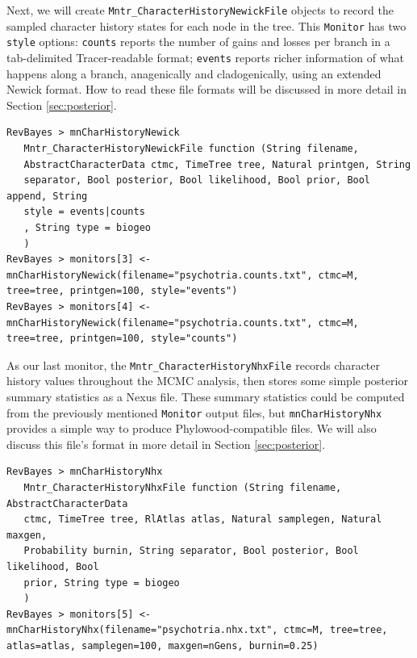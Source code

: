\documentclass[11pt]{article}
\begin{document}
Next, we will create {\tt Mntr\_CharacterHistoryNewickFile} objects to record the sampled character history states for each node in the tree.
This {\tt Monitor} has two {\tt style} options: {\tt counts} reports the number of gains and losses per branch in a tab-delimited Tracer-readable format;  {\tt events} reports richer information of what happens along a branch, anagenically and cladogenically, using an extended Newick format.
How to read these file formats will be discussed in more detail in Section \ref{sec:posterior}.

\begin{snugshade}
\begin{lstlisting}
RevBayes > mnCharHistoryNewick
   Mntr_CharacterHistoryNewickFile function (String filename,
   AbstractCharacterData ctmc, TimeTree tree, Natural printgen, String
   separator, Bool posterior, Bool likelihood, Bool prior, Bool append, String
   style = events|counts
   , String type = biogeo
   )
RevBayes > monitors[3] <- mnCharHistoryNewick(filename="psychotria.counts.txt", ctmc=M, tree=tree, printgen=100, style="events")
RevBayes > monitors[4] <- mnCharHistoryNewick(filename="psychotria.counts.txt", ctmc=M, tree=tree, printgen=100, style="counts")
\end{lstlisting}
\end{snugshade}

As our last monitor, the {\tt Mntr\_CharacterHistoryNhxFile} records character history values throughout the MCMC analysis, then stores some simple posterior summary statistics as a Nexus file.
These summary statistics could be computed from the previously mentioned {\tt Monitor} output files, but {\tt mnCharHistoryNhx} provides a simple way to produce Phylowood-compatible files.
We will also discuss this file's format in more detail in Section \ref{sec:posterior}.

\begin{snugshade}
\begin{lstlisting}
RevBayes > mnCharHistoryNhx
   Mntr_CharacterHistoryNhxFile function (String filename, AbstractCharacterData
   ctmc, TimeTree tree, RlAtlas atlas, Natural samplegen, Natural maxgen,
   Probability burnin, String separator, Bool posterior, Bool likelihood, Bool
   prior, String type = biogeo
   )
RevBayes > monitors[5] <- mnCharHistoryNhx(filename="psychotria.nhx.txt", ctmc=M, tree=tree, atlas=atlas, samplegen=100, maxgen=nGens, burnin=0.25)
\end{lstlisting}
\end{snugshade}
\end{document}
